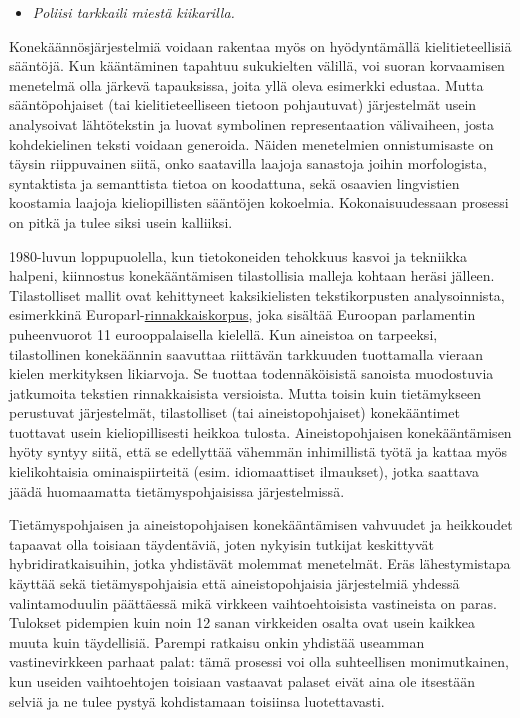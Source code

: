 \documentclass{../../metanetpaper}
\begin{document}
\begin{Parallel}[c]{79mm}{78mm}
{\begin{itemize}
\item[] \textit{Poliisi tarkkaili miestä kiikarilla.}
\end{itemize}

Konekäännösjärjestelmiä voidaan rakentaa myös on hyödyntämällä
kielitieteellisiä sääntöjä. Kun kääntäminen tapahtuu sukukielten
välillä, voi suoran korvaamisen menetelmä olla järkevä tapauksissa,
joita yllä oleva esimerkki edustaa. Mutta sääntöpohjaiset (tai
kielitieteelliseen tietoon pohjautuvat) järjestelmät usein analysoivat
lähtötekstin ja luovat symbolinen representaation välivaiheen, josta
kohdekielinen teksti voidaan generoida. Näiden menetelmien
onnistumisaste on täysin riippuvainen siitä, onko saatavilla laajoja
sanastoja joihin morfologista, syntaktista ja semanttista tietoa on
koodattuna, sekä osaavien lingvistien koostamia laajoja
kieliopillisten sääntöjen kokoelmia. Kokonaisuudessaan prosessi on
pitkä ja tulee siksi usein kalliiksi.

1980-luvun loppupuolella, kun tietokoneiden tehokkuus kasvoi ja
tekniikka halpeni, kiinnostus konekääntämisen tilastollisia malleja
kohtaan heräsi jälleen. Tilastolliset mallit ovat kehittyneet
kaksikielisten tekstikorpusten analysoinnista, esimerkkinä
Europarl-\underline{rinnakkaiskorpus}, joka sisältää Euroopan parlamentin
puheenvuorot 11 eurooppalaisella kielellä. Kun aineistoa on tarpeeksi,
tilastollinen konekäännin saavuttaa riittävän tarkkuuden tuottamalla
vieraan kielen merkityksen likiarvoja. Se tuottaa todennäköisistä
sanoista muodostuvia jatkumoita tekstien rinnakkaisista
versioista. Mutta toisin kuin tietämykseen perustuvat järjestelmät,
tilastolliset (tai aineistopohjaiset) konekääntimet tuottavat usein
kieliopillisesti heikkoa tulosta.  Aineistopohjaisen konekääntämisen
hyöty syntyy siitä, että se edellyttää vähemmän inhimillistä työtä ja
kattaa myös kielikohtaisia ominaispiirteitä (esim. idiomaattiset
ilmaukset), jotka saattava jäädä huomaamatta tietämyspohjaisissa
järjestelmissä.


Tietämyspohjaisen ja aineistopohjaisen konekääntämisen vahvuudet ja
heikkoudet tapaavat olla toisiaan täydentäviä, joten nykyisin tutkijat
keskittyvät hybridiratkaisuihin, jotka yhdistävät molemmat
menetelmät. Eräs lähestymistapa käyttää sekä tietämyspohjaisia että
aineistopohjaisia järjestelmiä yhdessä valintamoduulin päättäessä mikä
virkkeen vaihtoehtoisista vastineista on paras.  Tulokset pidempien
kuin noin 12 sanan virkkeiden osalta ovat usein kaikkea muuta kuin
täydellisiä. Parempi ratkaisu onkin yhdistää useamman vastinevirkkeen
parhaat palat: tämä prosessi voi olla suhteellisen monimutkainen, kun
useiden vaihtoehtojen toisiaan vastaavat palaset eivät aina ole
itsestään selviä ja ne tulee pystyä kohdistamaan toisiinsa
luotettavasti.

}
\end{Parallel}
\end{document}
